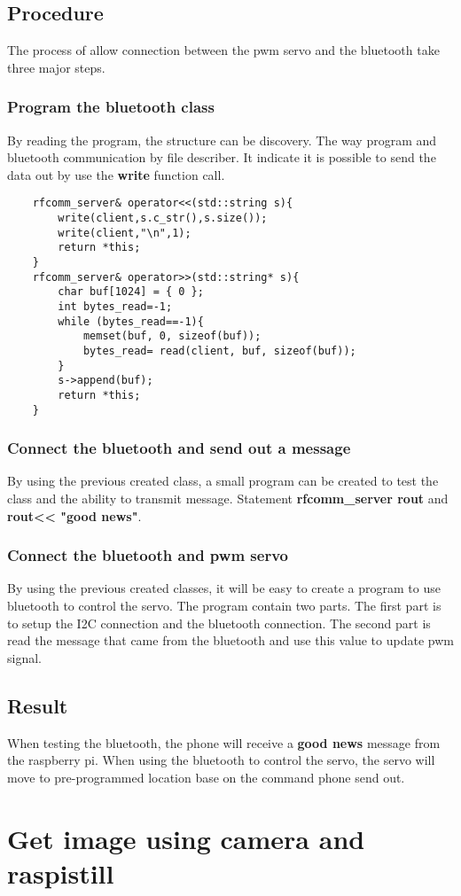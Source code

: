 \documentclass{article}
\begin{document}
\subsection{Procedure}
The process of allow connection between the pwm servo and the bluetooth take three major steps.
\subsubsection{Program the bluetooth class}
By reading the program, the structure can be discovery. The way program and bluetooth communication by file describer. It indicate it is possible to send the data out by use the \textbf{write} function call.
\begin{lstlisting}
    rfcomm_server& operator<<(std::string s){
		write(client,s.c_str(),s.size());
		write(client,"\n",1);
		return *this;
	}
	rfcomm_server& operator>>(std::string* s){
		char buf[1024] = { 0 };
		int bytes_read=-1;
		while (bytes_read==-1){
			memset(buf, 0, sizeof(buf));
			bytes_read= read(client, buf, sizeof(buf));
		}
		s->append(buf);
		return *this;
	}
\end{lstlisting}
\subsubsection{Connect the bluetooth and send out a message}
By using the previous created class, a small program can be created to test the class and the ability to transmit message. Statement \textbf{rfcomm\_server rout} and \textbf{rout<< "good news"}.
\subsubsection{Connect the bluetooth and pwm servo}
By using the previous created classes, it will be easy to create a program to use bluetooth to control the servo.
The program contain two parts. The first part is to setup the I2C connection and the bluetooth connection. The second part is read the message that came from the bluetooth and use this value to update pwm signal.
\subsection{Result}
When testing the bluetooth, the phone will receive a \textbf{good news} message from the raspberry pi.
When using the bluetooth to control the servo, the servo will move to pre-programmed location base on the command phone send out. 
\clearpage

\section{Get image using camera and raspistill}
\end{document}
